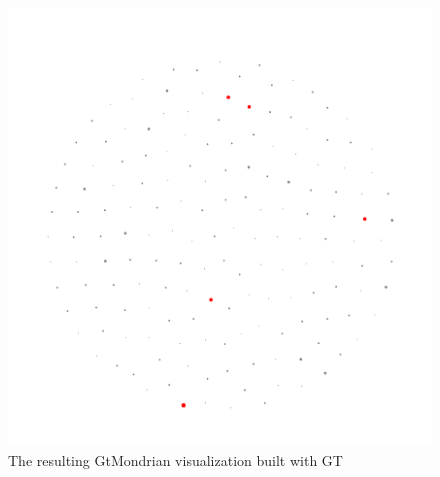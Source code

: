\documentclass [11pt, a4wide, twoside]{article}
\begin{document}
\begin{figure}[h]
\centering
\includegraphics[scale=0.38]{figures/mondrian.png}
\caption{The resulting GtMondrian visualization built with GT}
\label{fig:mondrian}
\end{figure}
\end{document}
